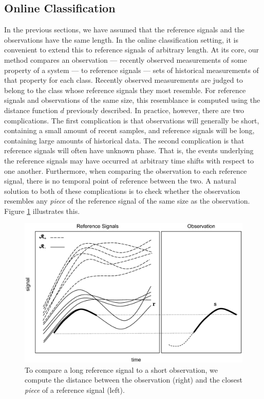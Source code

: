 \subsection{Online Classification}
In the previous sections, we have assumed that the reference signals and the
observations have the same length. In the online classification setting, it is
convenient to extend this to reference signals of arbitrary length. At its core,
our method compares an observation --- recently observed measurements of some
property of a system --- to reference signals --- sets of historical
measurements of that property for each class. Recently observed measurements are
judged to belong to the class whose reference signals they most resemble. For
reference signals and observations of the same size, this resemblance is
computed using the distance function $d$ previously described. In practice,
however, there are two complications. The first complication is that
observations will generally be short, containing a small amount of recent
samples, and reference signals will be long, containing large amounts of
historical data. The second complication is that reference signals will often
have unknown phase. That is, the events underlying the reference signals may
have occurred at arbitrary time shifts with respect to one another. Furthermore,
when comparing the observation to each reference signal, there is no temporal
point of reference between the two. A natural solution to both of these
complications is to check whether the observation resembles any {\em piece} of
the reference signal of the same size as the observation. Figure
\ref{fig:mindist} illustrates this.
\begin{figure}
\begin{center}
\includegraphics[width=6in]{mindist}
\end{center}
\caption{\label{fig:mindist} To compare a long reference signal to a short
  observation, we compute the distance between the observation (right) and the
  closest {\em piece} of a reference signal (left).}
\end{figure}

